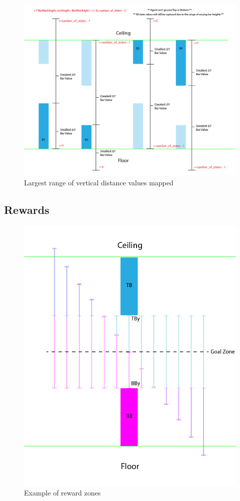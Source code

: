 \documentclass{article}
\begin{document}
\begin{figure}[h!]
    \centering
    \includegraphics[width=1\textwidth]{figure3}
    \caption{Largest range of vertical distance values mapped}
    \label{fig:mesh2}
\end{figure}

\subsection{Rewards}

\begin{figure}[h!]
    \centering
    \includegraphics[width=1\textwidth]{figure4}
    \caption{Example of reward zones}
    \label{fig:mesh2}
\end{figure}
\end{document}
